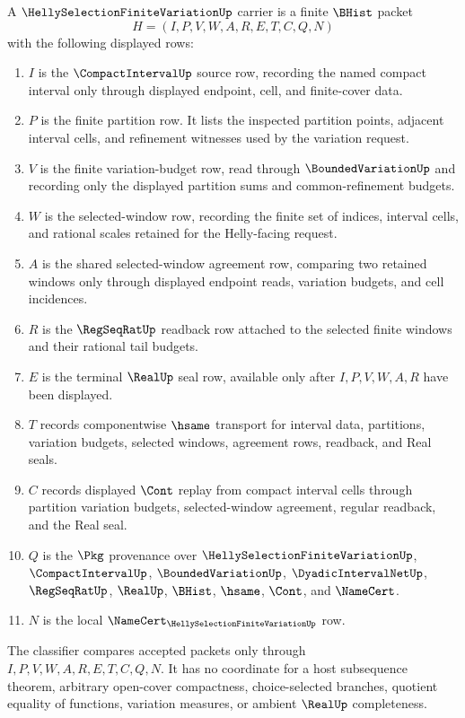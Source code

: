 \begin{definition}
\label{def:helly-selection-finite-variation-carrier}
A $\HellySelectionFiniteVariationUp$ carrier is a finite $\BHist$ packet
$$
H=(I,P,V,W,A,R,E,T,C,Q,N)
$$
with the following displayed rows:
\begin{enumerate}
\item $I$ is the $\CompactIntervalUp$ source row, recording the named compact interval only through displayed endpoint, cell, and finite-cover data.
\item $P$ is the finite partition row. It lists the inspected partition points, adjacent interval cells, and refinement witnesses used by the variation request.
\item $V$ is the finite variation-budget row, read through $\BoundedVariationUp$ and recording only the displayed partition sums and common-refinement budgets.
\item $W$ is the selected-window row, recording the finite set of indices, interval cells, and rational scales retained for the Helly-facing request.
\item $A$ is the shared selected-window agreement row, comparing two retained windows only through displayed endpoint reads, variation budgets, and cell incidences.
\item $R$ is the $\RegSeqRatUp$ readback row attached to the selected finite windows and their rational tail budgets.
\item $E$ is the terminal $\RealUp$ seal row, available only after $I,P,V,W,A,R$ have been displayed.
\item $T$ records componentwise $\hsame$ transport for interval data, partitions, variation budgets, selected windows, agreement rows, readback, and Real seals.
\item $C$ records displayed $\Cont$ replay from compact interval cells through partition variation budgets, selected-window agreement, regular readback, and the Real seal.
\item $Q$ is the $\Pkg$ provenance over $\HellySelectionFiniteVariationUp$, $\CompactIntervalUp$, $\BoundedVariationUp$, $\DyadicIntervalNetUp$, $\RegSeqRatUp$, $\RealUp$, $\BHist$, $\hsame$, $\Cont$, and $\NameCert$.
\item $N$ is the local $\NameCert_{\HellySelectionFiniteVariationUp}$ row.
\end{enumerate}
The classifier compares accepted packets only through $I,P,V,W,A,R,E,T,C,Q,N$. It has no coordinate for a host subsequence theorem, arbitrary open-cover compactness, choice-selected branches, quotient equality of functions, variation measures, or ambient $\RealUp$ completeness.
\end{definition}

